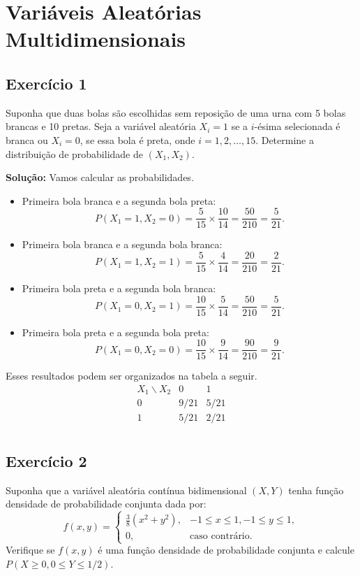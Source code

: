 \documentclass{article}
\begin{document}
\section{Variáveis Aleatórias Multidimensionais}
\subsection{Exercício 1}
Suponha que duas bolas são escolhidas sem reposição de uma urna com 5 bolas brancas e 10 pretas. Seja a variável aleatória $X_i = 1$ se a $i$-ésima selecionada é branca ou $X_i = 0$, se essa bola é preta, onde $i = 1, 2, \ldots, 15$. Determine a distribuição de probabilidade de $(X_1, X_2)$.

\vspace{0.5cm}
\textbf{Solução:} Vamos calcular as probabilidades.
\begin{itemize}
    \item Primeira bola branca e a segunda bola preta:
    $$P(X_1 = 1, X_2 = 0) = \frac{5}{15} \times \frac{10}{14} = \frac{50}{210} = \frac{5}{21}.$$
    
    \item Primeira bola branca e a segunda bola branca:
    $$P(X_1 = 1, X_2 = 1) = \frac{5}{15} \times \frac{4}{14} = \frac{20}{210} = \frac{2}{21}.$$
    
    \item Primeira bola preta e a segunda bola branca:
    $$P(X_1 = 0, X_2 = 1) = \frac{10}{15} \times \frac{5}{14} = \frac{50}{210} = \frac{5}{21}.$$
    
    \item Primeira bola preta e a segunda bola preta:
    $$P(X_1 = 0, X_2 = 0) = \frac{10}{15} \times \frac{9}{14} = \frac{90}{210} = \frac{9}{21}.$$
\end{itemize}

Esses resultados podem ser organizados na tabela a seguir.
    $$
    \begin{array}{c|cc}
    X_1 \backslash X_2 & 0 & 1 \\ \hline
    0 & 9/21 & 5/21 \\
    1 & 5/21 & 2/21 \\
    \end{array}
    $$

\subsection{Exercício 2}
Suponha que a variável aleatória contínua bidimensional $(X, Y)$ tenha função densidade de probabilidade conjunta dada por:
    $$
    f(x,y) =
    \begin{cases}
    \frac{3}{8}(x^2 + y^2), & -1 \le x \le 1, -1 \le y \le 1, \\
    0, & \text{caso contrário}.
    \end{cases}
    $$
Verifique se $f(x,y)$ é uma função densidade de probabilidade conjunta e calcule $P(X \ge 0, 0 \le Y \le 1/2)$.
\end{document}
